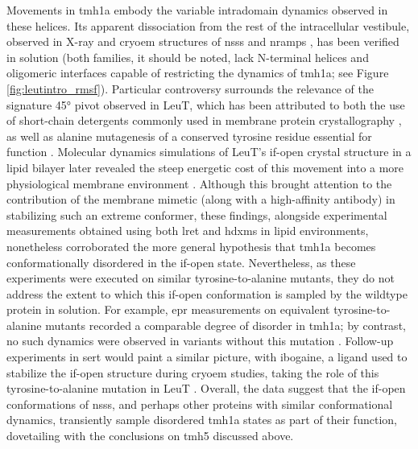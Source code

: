 Movements in \gls{tmh}1a embody the variable intradomain dynamics observed in these helices. Its apparent dissociation from the rest of the intracellular vestibule, observed in X-ray and \gls{cryoem} structures of \gls{nss}s and \gls{nramp}s \citep*{Bozzi2019, Coleman2019, Ehrnstorfer2014, Krishnamurthy2012}, has been verified in solution (both families, it should be noted, lack N-terminal helices and oligomeric interfaces capable of restricting the dynamics of \gls{tmh}1a; see Figure \ref{fig:leutintro_rmsf}). Particular controversy surrounds the relevance of the signature 45° pivot observed in LeuT, which has been attributed to both the use of short-chain detergents commonly used in membrane protein crystallography \citep*{Moeller2020, Sohail2016}, as well as alanine mutagenesis of a conserved tyrosine residue essential for function \citep*{Krishnamurthy2012, Loland2002}. Molecular dynamics simulations of LeuT's \gls{if}-open crystal structure in a lipid bilayer later revealed the steep energetic cost of this movement into a more physiological membrane environment \citep*{Sohail2016}. Although this brought attention to the contribution of the membrane mimetic (along with a high-affinity antibody) in stabilizing such an extreme conformer, these findings, alongside experimental measurements obtained using both \gls{lret} \citep*{Sohail2016} and \gls{hdxms} \citep*{Adhikary2017} in lipid environments, nonetheless corroborated the more general hypothesis that \gls{tmh}1a becomes conformationally disordered in the \gls{if}-open state. Nevertheless, as these experiments were executed on similar tyrosine-to-alanine mutants, they do not address the extent to which this \gls{if}-open conformation is sampled by the wildtype protein in solution. For example, \gls{epr} measurements on equivalent tyrosine-to-alanine mutants recorded a comparable degree of disorder in \gls{tmh}1a; by contrast, no such dynamics were observed in variants without this mutation \citep*{Kazmier2014a, Merkle2018}. Follow-up experiments in \gls{sert} would paint a similar picture, with ibogaine, a ligand used to stabilize the \gls{if}-open structure during \gls{cryoem} studies, taking the role of this tyrosine-to-alanine mutation in LeuT \citep*{Coleman2019, Moeller2019}. Overall, the data suggest that the \gls{if}-open conformations of \gls{nss}s, and perhaps other proteins with similar conformational dynamics, transiently sample disordered \gls{tmh}1a states as part of their function, dovetailing with the conclusions on \gls{tmh}5 discussed above.

